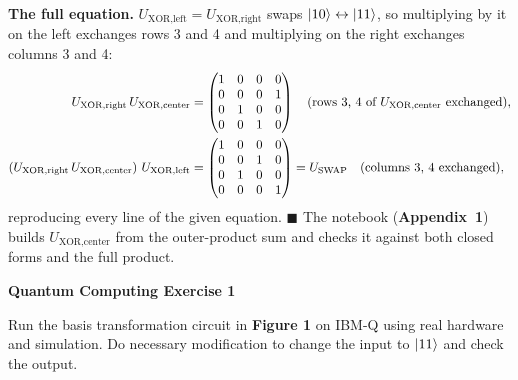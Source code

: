 \documentclass[a4paper, 10pt]{article}
\begin{document}
\begin{solution}
	\noindent \textbf{The full equation.} \( U_{\text{XOR},\text{left}} = U_{\text{XOR},\text{right}} \) swaps \( \ket{10} \leftrightarrow \ket{11} \), so multiplying by it on the left exchanges rows 3 and 4 and multiplying on the right exchanges columns 3 and 4:
	\begin{align*}
		U_{\text{XOR},\text{right}}\, U_{\text{XOR},\text{center}}
		 & = \begin{pmatrix}
			     1 & 0 & 0 & 0 \\ 0 & 0 & 0 & 1 \\ 0 & 1 & 0 & 0 \\ 0 & 0 & 1 & 0
		     \end{pmatrix}
		\quad (\text{rows 3, 4 of } U_{\text{XOR},\text{center}} \text{ exchanged}), \\
		\left(U_{\text{XOR},\text{right}}\, U_{\text{XOR},\text{center}}\right)\, U_{\text{XOR},\text{left}}
		 & = \begin{pmatrix}
			     1 & 0 & 0 & 0 \\ 0 & 0 & 1 & 0 \\ 0 & 1 & 0 & 0 \\ 0 & 0 & 0 & 1
		     \end{pmatrix}
		= U_{\text{SWAP}}
		\quad (\text{columns 3, 4 exchanged}),
	\end{align*}
	reproducing every line of the given equation. \( \blacksquare \)
	The notebook (\textbf{Appendix~1}) builds \( U_{\text{XOR},\text{center}} \) from the outer-product sum and checks it against both closed forms and the full product.
\end{solution}

\newpage

\begin{problem}
\textbf{Quantum Computing Exercise 1}
\par Run the basis transformation circuit in \textbf{Figure 1} on IBM-Q using real hardware and simulation.
Do necessary modification to change the input to \( \ket{11} \) and check the output.
\end{problem}
\end{document}

